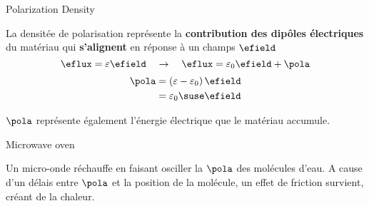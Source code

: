 \begin{frame}{Polarization Density}
    \begin{twocolumns}[0.6]
        \leftcol
        La densitée de polarisation représente la \textbf{contribution des dipôles électriques} du matériau qui \textbf{s'alignent} en réponse à un champs $\efield$
        \begin{equation*}
            \eflux = \varepsilon \efield \hspace{1em} \rightarrow \hspace{1em} \eflux = \varepsilon_0 \efield + \pola
        \end{equation*}
        \vspace{10pt}
        \begin{equation*}
            \begin{aligned}
                \pola &=  \left(\varepsilon - \varepsilon_0 \right) \efield\\
                &= \varepsilon_0 \suse \efield
            \end{aligned}
        \end{equation*}
        \rightcol
    \end{twocolumns}
    \centering
    $\pola$ représente également l'énergie électrique que le matériau accumule.
\end{frame}

\begin{frame}{Microwave oven}
    \begin{twocolumns}[0.6]
        \leftcol
        \rightcol
    \end{twocolumns}
    \centering
    \vspace{-20pt}
    Un micro-onde réchauffe en faisant osciller la $\pola$ des molécules d'eau. A cause d'un délais entre $\pola$ et la position de la molécule, un effet de friction survient, créant de la chaleur. 
\end{frame}

